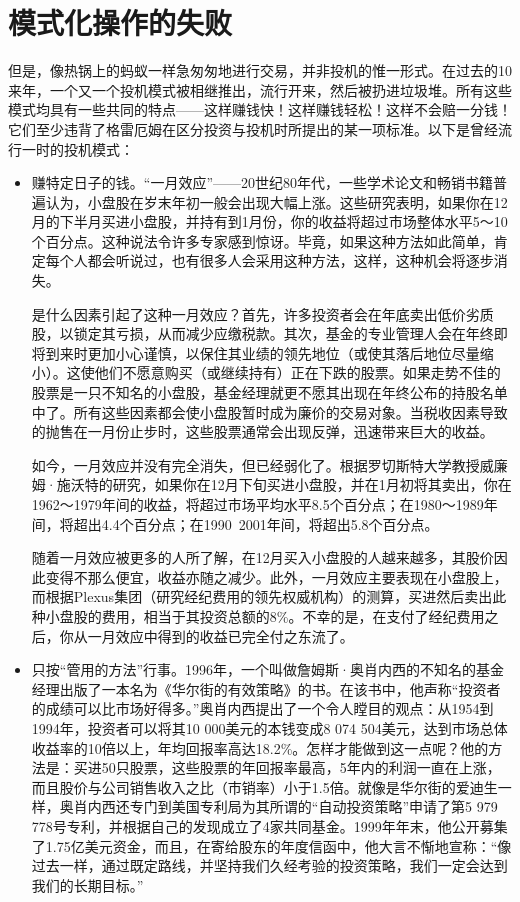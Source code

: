 \documentclass[12pt,oneside]{book}
\begin{document}
\section{模式化操作的失败}
但是，像热锅上的蚂蚁一样急匆匆地进行交易，并非投机的惟一形式。在过去的10来年，一个又一个投机模式被相继推出，流行开来，然后被扔进垃圾堆。所有这些模式均具有一些共同的特点——这样赚钱快！这样赚钱轻松！这样不会赔一分钱！它们至少违背了格雷厄姆在区分投资与投机时所提出的某一项标准。以下是曾经流行一时的投机模式：

\begin{itemize}
\item 赚特定日子的钱。“一月效应”——20世纪80年代，一些学术论文和畅销书籍普遍认为，小盘股在岁末年初一般会出现大幅上涨。这些研究表明，如果你在12月的下半月买进小盘股，并持有到1月份，你的收益将超过市场整体水平5～10个百分点。这种说法令许多专家感到惊讶。毕竟，如果这种方法如此简单，肯定每个人都会听说过，也有很多人会采用这种方法，这样，这种机会将逐步消失。

是什么因素引起了这种一月效应？首先，许多投资者会在年底卖出低价劣质股，以锁定其亏损，从而减少应缴税款。其次，基金的专业管理人会在年终即将到来时更加小心谨慎，以保住其业绩的领先地位（或使其落后地位尽量缩小）。这使他们不愿意购买（或继续持有）正在下跌的股票。如果走势不佳的股票是一只不知名的小盘股，基金经理就更不愿其出现在年终公布的持股名单中了。所有这些因素都会使小盘股暂时成为廉价的交易对象。当税收因素导致的抛售在一月份止步时，这些股票通常会出现反弹，迅速带来巨大的收益。

如今，一月效应并没有完全消失，但已经弱化了。根据罗切斯特大学教授威廉姆·施沃特的研究，如果你在12月下旬买进小盘股，并在1月初将其卖出，你在1962～1979年间的收益，将超过市场平均水平8.5个百分点；在1980～1989年间，将超出4.4个百分点；在1990~2001年间，将超出5.8个百分点。

随着一月效应被更多的人所了解，在12月买入小盘股的人越来越多，其股价因此变得不那么便宜，收益亦随之减少。此外，一月效应主要表现在小盘股上，而根据Plexus集团（研究经纪费用的领先权威机构）的测算，买进然后卖出此种小盘股的费用，相当于其投资总额的8\%。不幸的是，在支付了经纪费用之后，你从一月效应中得到的收益已完全付之东流了。

\item 只按“管用的方法”行事。1996年，一个叫做詹姆斯·奥肖内西的不知名的基金经理出版了一本名为《华尔街的有效策略》的书。在该书中，他声称“投资者的成绩可以比市场好得多。”奥肖内西提出了一个令人瞠目的观点：从1954到1994年，投资者可以将其10 000美元的本钱变成8 074 504美元，达到市场总体收益率的10倍以上，年均回报率高达18.2\%。怎样才能做到这一点呢？他的方法是：买进50只股票，这些股票的年回报率最高，5年内的利润一直在上涨，而且股价与公司销售收入之比（市销率）小于1.5倍。就像是华尔街的爱迪生一样，奥肖内西还专门到美国专利局为其所谓的“自动投资策略”申请了第5 979 778号专利，并根据自己的发现成立了4家共同基金。1999年年末，他公开募集了1.75亿美元资金，而且，在寄给股东的年度信函中，他大言不惭地宣称：“像过去一样，通过既定路线，并坚持我们久经考验的投资策略，我们一定会达到我们的长期目标。”


\end{itemize}
\end{document}
